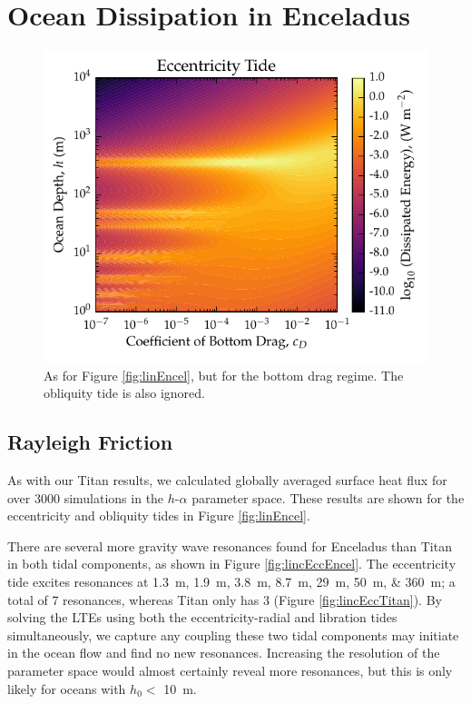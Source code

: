 \section{Ocean Dissipation in Enceladus \label{sec:results_Enceladus}}

\begin{figure}[!h]
    \centering
    \includegraphics[width=\linewidth]{Figures/enceladus_bottom}
\caption{As for Figure \ref{fig:linEncel}, but for the bottom drag regime. The obliquity tide is also ignored. \label{fig:botEncel}}
\end{figure}

\subsection{Rayleigh Friction} \label{sec:ray_enc}

As with our Titan results, we calculated globally averaged surface heat flux for over 3000 simulations in the $h$-$\alpha$ parameter space. These results are shown for the eccentricity and obliquity tides in Figure \ref{fig:linEncel}.

There are several more gravity wave resonances found for Enceladus than Titan in both tidal components, as shown in Figure \ref{fig:lincEccEncel}. The eccentricity tide excites resonances at \SIlist{1.3;1.9;3.8;8.7;29;50;360}{m}; a total of 7 resonances, whereas Titan only has 3 (Figure \ref{fig:lincEccTitan}). By solving the LTEs using both the eccentricity-radial and libration tides simultaneously, we capture any coupling these two tidal components may initiate in the ocean flow and find no new resonances. Increasing the resolution of the parameter space would almost certainly reveal more resonances, but this is only likely for oceans with $h_0 <$ \SI{10}{\metre}. 

